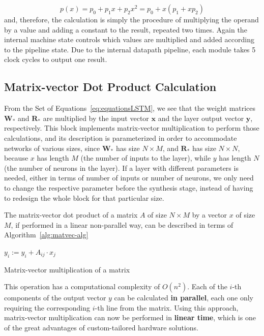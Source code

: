 \documentclass{IEEEtran}
\newcommand{\mb}[1]{\mathbf{#1}}
\begin{document}
\begin{equation}\label{eq:factorPol}
p(x) = p_0 + p_1x + p_2x^2 = p_0 + x(p_1 + xp_2)
\end{equation}
and, therefore, the calculation is simply the procedure of multiplying the operand by a value and adding a constant to the result,
repeated two times. Again the internal machine state controls which values are multiplied and added according to the pipeline state.
Due to the internal datapath pipeline, each module takes 5 clock cycles to output one result.


\subsection{Matrix-vector Dot Product Calculation}\label{sec:proprarch_dot}
From the Set of Equations~\ref{eq:equationsLSTM}, we see that the weight matrices $\mb{W}_*$ and $\mb{R}_*$ are
multiplied by the input vector $\mb{x}$ and the layer output vector $\mb{y}$, respectively. This block implements
matrix-vector multiplication to perform those calculations, and its description is parameterized in
order to accommodate networks of various sizes, since $\mb{W}_*$ has size $N\times M$, and $\mb{R}_*$
has size $N\times N$, because $x$ has length $M$ (the number of inputs to the layer), while $y$ has length $N$
(the number of neurons in the layer). If a layer with different parameters is needed, either in terms of
number of inputs or number of neurons, we only need to change the respective parameter before the synthesis stage,
instead of having to redesign the whole block for that particular size.

The matrix-vector dot product of a matrix $A$ of size $N \times M$ by a vector $x$ of size $M$, if performed in a linear non-parallel way, can be described in terms of Algorithm~\ref{alg:matvec-alg}

\begin{algorithm}
\begin{algorithmic}
    \State $y_i := y_i + A_{ij} \cdot x_j$
    \EndFor
\EndFor
\end{algorithmic}
\caption{Matrix-vector multiplication of a matrix}
\label{alg:matvec-alg}
\end{algorithm}
This operation has a computational complexity of $O(n^2)$. Each of the $i$-th components of the output vector $y$ can be calculated \textbf{in parallel},
each one only requiring the corresponding $i$-th line from the matrix. Using this approach, matrix-vector multiplication can now be performed in \textbf{linear time},
which is one of the great advantages of custom-tailored hardware solutions.
\end{document}
